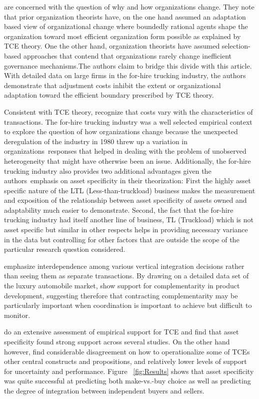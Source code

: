 \documentclass[12pt]{article}
\begin{document}
\cite{Nickerson2003} are concerned with the question of why and how organizations change. They note that prior organization theorists have, on the one hand assumed an adaptation based view of organizational change  where boundedly rational agents shape the organization toward most efficient organization form possible as explained by TCE theory. One the other hand, organization theorists have assumed selection-based approaches that contend that organizations rarely change inefficient governance mechanisms.The authors claim to bridge this divide with this article. With detailed data on large firms in the for-hire trucking industry, the authors demonstrate that adjustment costs inhibit the extent or organizational adaptation toward the efficient boundary prescribed by TCE theory.

Consistent with TCE theory, \cite{Nickerson2003} recognize that costs vary with the characteristics of transactions. The for-hire trucking industry was a well selected empirical context to explore the question of how organizations change because the unexpected deregulation of the industry in 1980 threw up a variation in organizations\textquotesingle  \  responses that helped in dealing with the problem of unobserved heterogeneity that might have otherwise been an issue. Additionally, the for-hire trucking industry also provides two additional advantages given the authors\textquotesingle \ emphasis on asset specificity in their theorization: First the highly asset specific nature of the LTL (Less-than-truckload) business makes the measurement and exposition of the relationship between asset specificity of assets owned and adaptability much easier to demonstrate. Second, the fact that the for-hire trucking industry had itself another line of business,  TL (Truckload)  which is not asset specific but similar in other respects helps in providing necessary variance in the data but controlling for other factors that are outside the scope of the particular research question considered.

\cite{Novak2009} emphasize interdependence among various vertical integration decisions rather than seeing them as separate transactions. By drawing on a detailed data set of the luxury automobile market, \cite{Novak2009} show support for complementarity in product development, suggesting therefore that  contracting complementarity may be particularly important when coordination is important to achieve but difficult to monitor.

\cite{David2004} do an extensive assessment of empirical support for TCE and find that asset specificity found strong support across several studies. On the other hand however, \cite{David2004} find considerable disagreement on how to operationalize some of TCE\textquotesingle s other central constructs and propositions, and relatively lower levels of support for uncertainty and performance. Figure ~\ref{fig:Results} shows that asset specificity was quite successful at predicting both make-vs.-buy choice as well as predicting the degree of integration between independent buyers and sellers.
 
\end{document}
